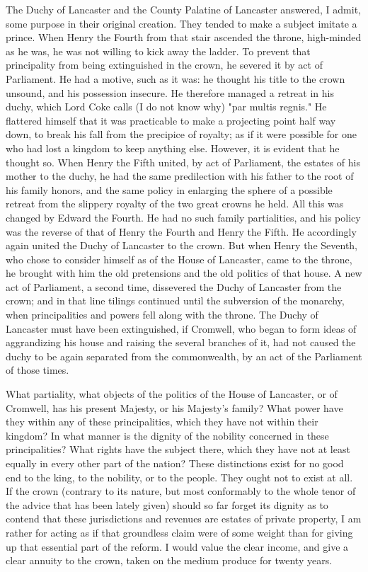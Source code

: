 The Duchy of Lancaster and the County Palatine of Lancaster answered, I admit, some purpose in their original creation. They tended to make a subject imitate a prince. When Henry the Fourth from that stair ascended the throne, high-minded as he was, he was not willing to kick away the ladder. To prevent that principality from being extinguished in the crown, he severed it by act of Parliament. He had a motive, such as it was: he thought his title to the crown unsound, and his possession insecure. He therefore managed a retreat in his duchy, which Lord Coke calls (I do not know why) "par multis regnis." He flattered himself that it was practicable to make a projecting point half way down, to break his fall from the precipice of royalty; as if it were possible for one who had lost a kingdom to keep anything else. However, it is evident that he thought so. When Henry the Fifth united, by act of Parliament, the estates of his mother to the duchy, he had the same predilection with his father to the root of his family honors, and the same policy in enlarging the sphere of a possible retreat from the slippery royalty of the two great crowns he held. All this was changed by Edward the Fourth. He had no such family partialities, and his policy was the reverse of that of Henry the Fourth and Henry the Fifth. He accordingly again united the Duchy of Lancaster to the crown. But when Henry the Seventh, who chose to consider himself as of the House of Lancaster, came to the throne, he brought with him the old pretensions and the old politics of that house. A new act of Parliament, a second time, dissevered the Duchy of Lancaster from the crown; and in that line tilings continued until the subversion of the monarchy, when principalities and powers fell along with the throne. The Duchy of Lancaster must have been extinguished, if Cromwell, who began to form ideas of aggrandizing his house and raising the several branches of it, had not caused the duchy to be again separated from the commonwealth, by an act of the Parliament of those times.

What partiality, what objects of the politics of the House of Lancaster, or of Cromwell, has his present Majesty, or his Majesty's family? What power have they within any of these principalities, which they have not within their kingdom? In what manner is the dignity of the nobility concerned in these principalities? What rights have the subject there, which they have not at least equally in every other part of the nation? These distinctions exist for no good end to the king, to the nobility, or to the people. They ought not to exist at all. If the crown (contrary to its nature, but most conformably to the whole tenor of the advice that has been lately given) should so far forget its dignity as to contend that these jurisdictions and revenues are estates of private property, I am rather for acting as if that groundless claim were of some weight than for giving up that essential part of the reform. I would value the clear income, and give a clear annuity to the crown, taken on the medium produce for twenty years.

